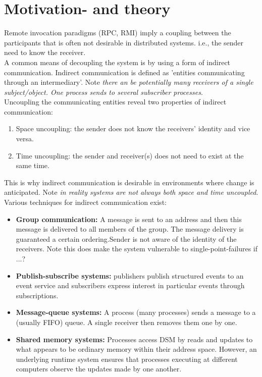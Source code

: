 \section{Motivation- and theory}
\label{jgroup_motivation}
Remote invocation paradigms (RPC, RMI) imply a coupling between the participants that is often not desirable in distributed systems. i.e., the sender need to know the receiver. \\

 A common means of decoupling the system is by using a form of indirect communication. Indirect communication is defined as 'entities communicating through an intermediary'. Note \textit{there an be potentially many receivers of a single subject/object. One process sends to several subscriber processes}.\\

Uncoupling the communicating entities reveal two properties of indirect communication: 

\begin{enumerate}
\item Space uncoupling: the sender does not know the receivers' identity and vice versa. 
\item Time uncoupling: the sender and receiver(s) does not need to exist at the same time.  
\end{enumerate}

This is why indirect communication is desirable in environments where change is anticipated. Note \textit{in reality systems are not always both space and time uncoupled}. \\


Various techniques for indirect communication exist:\\

\begin{itemize}
\item \textbf{Group communication:} A message is sent to an address  and then this message is delivered to all members of the group. The message delivery is guaranteed a certain ordering.Sender is not aware of the identity of the receivers. Note this does make the system vulnerable to single-point-failures if ...? \\

\item \textbf{Publish-subscribe systems:} publishers publish structured events to an event service and subscribers express interest in particular events through  subscriptions. \\

\item \textbf{Message-queue systems:} A process (many processes) sends a message to a (usually FIFO) queue. A single receiver then removes them one by one.\\

\item \textbf{Shared memory systems:} Processes access DSM by reads and updates to what appears to be ordinary memory within their address space. However, an underlying runtime system ensures that processes executing at different computers observe the updates made by one another.\\
\end{itemize}

